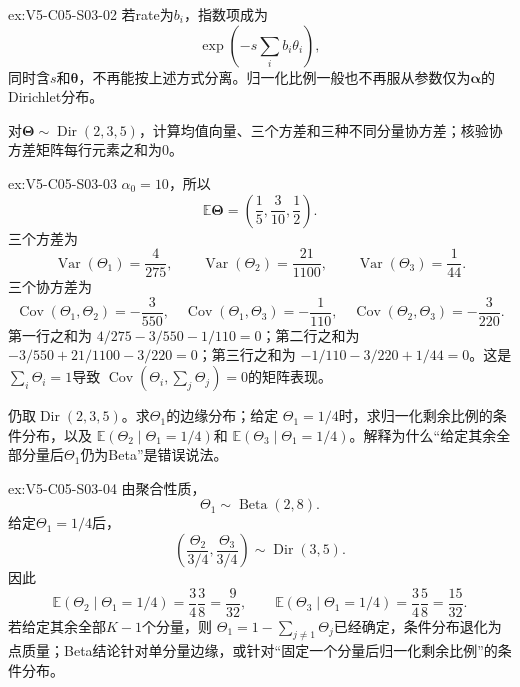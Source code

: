 \begin{SLChapterExercisePairSection}
\begin{chapterexercisesolution}{ex:V5-C05-S03-02}
若rate为$b_i$，指数项成为
\[
\exp\!\left(-s\sum_i b_i\theta_i\right),
\]
同时含$s$和$\boldsymbol\theta$，不再能按上述方式分离。归一化比例一般也不再服从参数仅为$\boldsymbol\alpha$的Dirichlet分布。
\end{chapterexercisesolution}
\fi

\begin{exercise}\label{ex:V5-C05-S03-03}
对$\boldsymbol\Theta\sim\operatorname{Dir}(2,3,5)$，计算均值向量、三个方差和三种不同分量协方差；核验协方差矩阵每行元素之和为$0$。
\end{exercise}
\ifSLFullEdition
{}\label{sol:V5-C05-S03-03}
\begin{chapterexercisesolution}{ex:V5-C05-S03-03}
\nopagebreak[4]
$\alpha_0=10$，所以
\[
\mathbb E\boldsymbol\Theta
=\left(\frac15,\frac3{10},\frac12\right).
\]
三个方差为
\[
\operatorname{Var}(\Theta_1)=\frac4{275},\qquad
\operatorname{Var}(\Theta_2)=\frac{21}{1100},\qquad
\operatorname{Var}(\Theta_3)=\frac1{44}.
\]
三个协方差为
\[
\operatorname{Cov}(\Theta_1,\Theta_2)=-\frac3{550},\quad
\operatorname{Cov}(\Theta_1,\Theta_3)=-\frac1{110},\quad
\operatorname{Cov}(\Theta_2,\Theta_3)=-\frac3{220}.
\]
第一行之和为
$4/275-3/550-1/110=0$；第二行之和为
$-3/550+21/1100-3/220=0$；第三行之和为
$-1/110-3/220+1/44=0$。这是
$\sum_i\Theta_i=1$导致
$\operatorname{Cov}(\Theta_i,\sum_j\Theta_j)=0$的矩阵表现。
\end{chapterexercisesolution}
\fi

\begin{exercise}\label{ex:V5-C05-S03-04}
仍取$\operatorname{Dir}(2,3,5)$。求$\Theta_1$的边缘分布；给定
$\Theta_1=1/4$时，求归一化剩余比例的条件分布，以及
$\mathbb E(\Theta_2\mid\Theta_1=1/4)$和
$\mathbb E(\Theta_3\mid\Theta_1=1/4)$。解释为什么“给定其余全部分量后$\Theta_1$仍为Beta”是错误说法。
\end{exercise}
\ifSLFullEdition
{}\label{sol:V5-C05-S03-04}
\begin{chapterexercisesolution}{ex:V5-C05-S03-04}
\nopagebreak[4]
由聚合性质，
\[
\Theta_1\sim\operatorname{Beta}(2,8).
\]
给定$\Theta_1=1/4$后，
\[
\left(\frac{\Theta_2}{3/4},
\frac{\Theta_3}{3/4}\right)
\sim\operatorname{Dir}(3,5).
\]
因此
\[
\mathbb E(\Theta_2\mid\Theta_1=1/4)
=\frac34\frac38=\frac9{32},
\qquad
\mathbb E(\Theta_3\mid\Theta_1=1/4)
=\frac34\frac58=\frac{15}{32}.
\]
若给定其余全部$K-1$个分量，则
$\Theta_1=1-\sum_{j\ne1}\Theta_j$已经确定，条件分布退化为点质量；Beta结论针对单分量边缘，或针对“固定一个分量后归一化剩余比例”的条件分布。
\end{chapterexercisesolution}
\fi


\end{SLChapterExercisePairSection}
